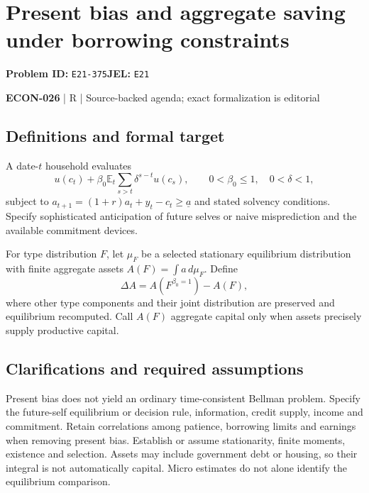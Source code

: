 \documentclass[11pt,a4paper]{article}
\begin{document}
\section*{Present bias and aggregate saving under borrowing constraints}
\textbf{Problem ID:} \texttt{E21-375}\quad \textbf{JEL:} \texttt{E21}\par
\label{problem:OP-0607}


\label{audited:ECON-026}

{\sffamily\small\color{muted}\textbf{ECON-026} | R | Source-backed agenda; exact formalization is editorial\par}

\subsection*{Definitions and formal target}

A date-\(t\) household evaluates
\[
 u(c_t)+\beta_0\mathbb E_t\sum_{s>t}\delta^{s-t}u(c_s),
 \qquad 0<\beta_0\leq1,\quad0<\delta<1,
\]
subject to \(a_{t+1}=(1+r)a_t+y_t-c_t\geq\underline a\) and stated solvency conditions. Specify sophisticated anticipation of future selves or naive misprediction and the available commitment devices.

For type distribution \(F\), let \(\mu_F\) be a selected stationary equilibrium distribution with finite aggregate assets \(A(F)=\int a\,d\mu_F\). Define
\[
 \Delta A=A(F^{\beta_0=1})-A(F),
\]
where other type components and their joint distribution are preserved and equilibrium recomputed. Call \(A(F)\) aggregate capital only when assets precisely supply productive capital.

\subsection*{Clarifications and required assumptions}

Present bias does not yield an ordinary time-consistent Bellman problem. Specify the future-self equilibrium or decision rule, information, credit supply, income and commitment. Retain correlations among patience, borrowing limits and earnings when removing present bias. Establish or assume stationarity, finite moments, existence and selection. Assets may include government debt or housing, so their integral is not automatically capital. Micro estimates do not alone identify the equilibrium comparison.
\end{document}
